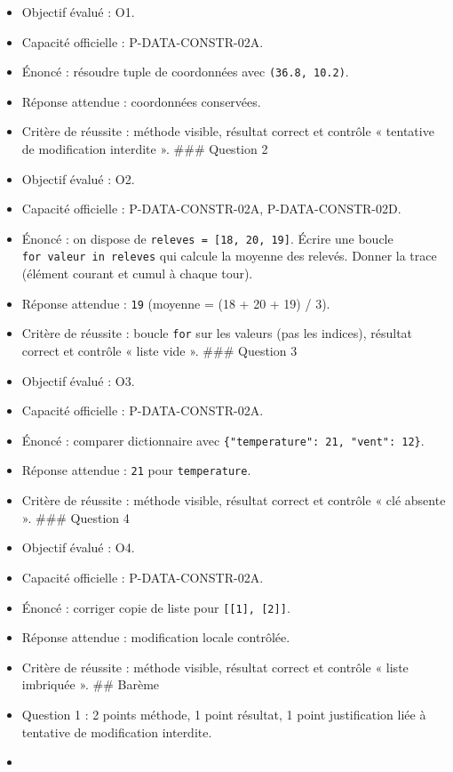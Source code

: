 \begin{itemize}
\tightlist
\item
  Objectif évalué : O1.
\item
  Capacité officielle : P-DATA-CONSTR-02A.
\item
  Énoncé : résoudre tuple de coordonnées avec \texttt{(36.8,\ 10.2)}.
\item
  Réponse attendue : coordonnées conservées.
\item
  Critère de réussite : méthode visible, résultat correct et contrôle «
  tentative de modification interdite ». \#\#\# Question 2
\item
  Objectif évalué : O2.
\item
  Capacité officielle : P-DATA-CONSTR-02A, P-DATA-CONSTR-02D.
\item
  Énoncé : on dispose de \texttt{releves\ =\ {[}18,\ 20,\ 19{]}}. Écrire
  une boucle \texttt{for\ valeur\ in\ releves} qui calcule la moyenne
  des relevés. Donner la trace (élément courant et cumul à chaque tour).
\item
  Réponse attendue : \texttt{19} (moyenne = (18 + 20 + 19) / 3).
\item
  Critère de réussite : boucle \texttt{for} sur les valeurs (pas les
  indices), résultat correct et contrôle « liste vide ». \#\#\# Question
  3
\item
  Objectif évalué : O3.
\item
  Capacité officielle : P-DATA-CONSTR-02A.
\item
  Énoncé : comparer dictionnaire avec
  \texttt{\{"temperature":\ 21,\ "vent":\ 12\}}.
\item
  Réponse attendue : \texttt{21} pour \texttt{temperature}.
\item
  Critère de réussite : méthode visible, résultat correct et contrôle «
  clé absente ». \#\#\# Question 4
\item
  Objectif évalué : O4.
\item
  Capacité officielle : P-DATA-CONSTR-02A.
\item
  Énoncé : corriger copie de liste pour
  \texttt{{[}{[}1{]},\ {[}2{]}{]}}.
\item
  Réponse attendue : modification locale contrôlée.
\item
  Critère de réussite : méthode visible, résultat correct et contrôle «
  liste imbriquée ». \#\# Barème
\item
  Question 1 : 2 points méthode, 1 point résultat, 1 point justification
  liée à tentative de modification interdite.
\item

\end{itemize}
